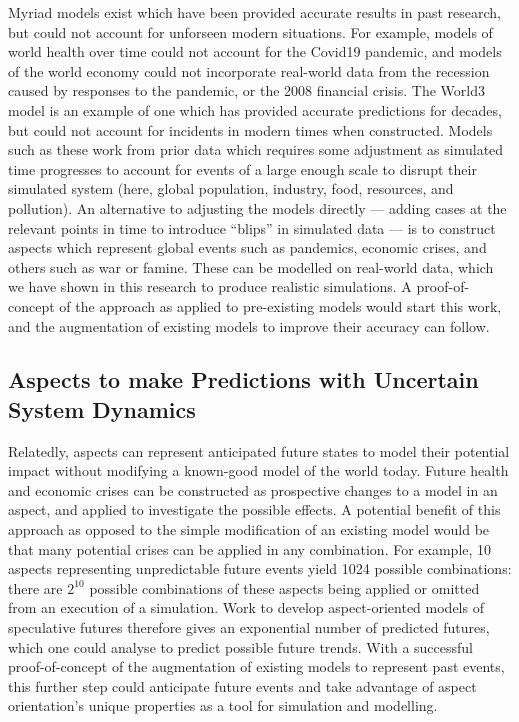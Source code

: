 Myriad models exist which have been provided accurate results in past research,
but could not account for unforseen modern situations. For example, models of
world health over time could not account for the Covid19 pandemic, and models of
the world economy could not incorporate real-world data from the recession
caused by responses to the pandemic, or the 2008 financial crisis. The World3
model is an example of one which has provided accurate predictions for decades,
but could not account for incidents in modern times when constructed. Models
such as these work from prior data which requires some adjustment as simulated
time progresses to account for events of a large enough scale to disrupt their
simulated system (here, global population, industry, food, resources, and
pollution). An alternative to adjusting the models directly --- adding cases at
the relevant points in time to introduce ``blips'' in simulated data --- is to
construct aspects which represent global events such as pandemics, economic
crises, and others such as war or famine. These can be modelled on real-world
data, which we have shown in this research to produce realistic simulations. A
proof-of-concept of the approach as applied to pre-existing models would start
this work, and the augmentation of existing models to improve their accuracy can
follow.
    

\subsection{Aspects to make Predictions with Uncertain System Dynamics}

Relatedly, aspects can represent anticipated future states
to model their potential impact without modifying a known-good model of the
world today. Future health and economic crises can be constructed as prospective
changes to a model in an aspect, and applied to investigate the possible
effects. A potential benefit of this approach as opposed to the simple
modification of an existing model would be that many potential crises can be
applied in any combination. For example, 10 aspects representing unpredictable
future events yield 1024 possible combinations: there are \(2^{10}\) possible
combinations of these aspects being applied or omitted from an execution of a
simulation. Work to develop aspect-oriented models of speculative futures
therefore gives an exponential number of predicted futures, which one could
analyse to predict possible future trends. With a successful proof-of-concept of
the augmentation of existing models to represent past events, this further step
could anticipate future events and take advantage of aspect orientation's unique
properties as a tool for simulation and modelling.



